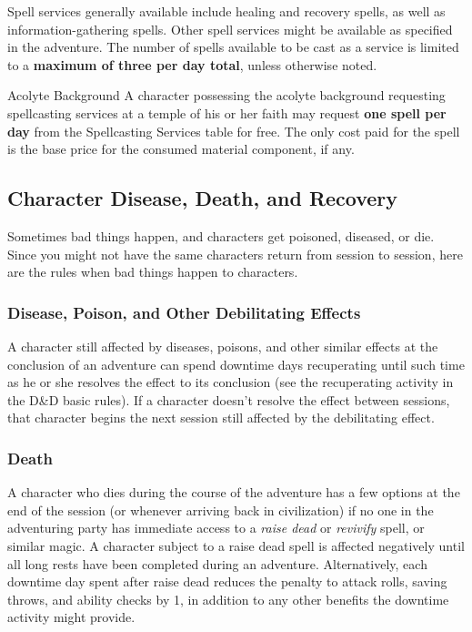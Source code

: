 \documentclass[10pt,a4paper,twoside,bg=print,twocolumn,openany,nodeprecatedcode]{dndbook}
\begin{document}
Spell services generally available include healing and recovery spells, as well as information-gathering spells. Other spell services might be available as specified in the adventure. The number of spells available to be cast as a service is limited to a \textbf{maximum of three per day total}, unless otherwise noted.

\begin{DndSidebar}[float=!b]{Acolyte Background}
A character possessing the acolyte background requesting spellcasting services at a temple of his or her faith may request \textbf{one spell per day} from the Spellcasting Services table for free. The only cost paid for the spell is the base price for the consumed material component, if any.



\end{DndSidebar}

\subsection{Character Disease, Death, and Recovery}
Sometimes bad things happen, and characters get poisoned, diseased, or die. Since you might not have the same characters return from session to session, here are the rules when bad things happen to characters.

\subsubsection{Disease, Poison, and Other Debilitating Effects}
A character still affected by diseases, poisons, and other similar effects at the conclusion of an adventure can spend downtime days recuperating until such time as he or she resolves the effect to its conclusion (see the recuperating activity in the D\&D basic rules). If a character doesn't resolve the effect between sessions, that character begins the next session still affected by the debilitating effect.

\subsubsection{Death}
A character who dies during the course of the adventure has a few options at the end of the session (or whenever arriving back in civilization) if no one in the adventuring party has immediate access to a \textit{raise dead} or \textit{revivify} spell, or similar magic. A character subject to a raise dead spell is affected negatively until all long rests have been completed during an adventure. Alternatively, each downtime day spent after raise dead reduces the penalty to attack rolls, saving throws, and ability checks by 1, in addition to any other benefits the downtime activity might provide.
\end{document}

